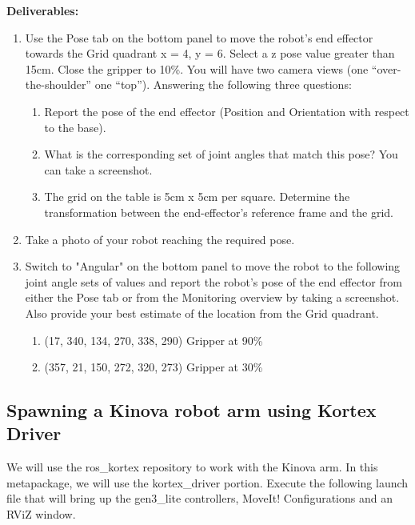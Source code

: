 \documentclass[12pt]{article}
\begin{document}
\textbf{Deliverables:}
\begin{enumerate}
    \item Use the Pose tab on the bottom panel to move the robot’s end effector towards the Grid quadrant x = 4, y = 6. Select a z pose value greater than 15cm. Close the gripper to 10\%. You will have two camera views (one “over-the-shoulder” one “top”). Answering the following three questions:
    \begin{enumerate}
    \item Report the pose of the end effector (Position and Orientation with respect to the base).
    
    \item What is the corresponding set of joint angles that match this pose? You can take a screenshot.

    \item The grid on the table is 5cm x 5cm per square. Determine the transformation between the end-effector’s reference frame and the grid.
    \end{enumerate}
    
    \item Take a photo of your robot reaching the required pose.
    
    \item Switch to "Angular" on the bottom panel to move the robot to the following joint angle sets of values and report the robot’s pose of the end effector from either the Pose tab or from the Monitoring overview by taking a screenshot. Also provide your best estimate of the location from the Grid quadrant.
    
     \begin{enumerate}
    \item (17, 340, 134, 270, 338, 290) Gripper at 90\%
    
    
    \item (357, 21, 150, 272, 320, 273) Gripper at 30\%
    \end{enumerate}
\end{enumerate}




\subsection{Spawning a Kinova robot arm using Kortex Driver}

We will use the ros\_kortex repository to work with the Kinova arm. In this metapackage, we will use the kortex\_driver portion. Execute the following launch file that will bring up the gen3\_lite controllers, MoveIt! Configurations and an RViZ window.
\end{document}
